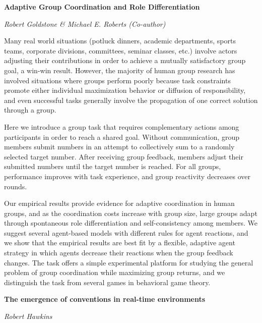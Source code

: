 \documentclass[10pt,letterpaper]{article}
\begin{document}
\begin{center}\textbf{Adaptive Group Coordination and Role Differentiation}\end{center}
\begin{center}\emph{Robert Goldstone \& Michael E. Roberts (Co-author)}\end{center}

Many real world situations (potluck dinners, academic departments, sports teams, corporate divisions, committees, seminar classes, etc.) involve actors adjusting their contributions in order to achieve a mutually satisfactory group goal, a win-win result.  However, the majority of human group research has involved situations where groups perform poorly because task constraints promote either individual maximization behavior or diffusion of responsibility, and even successful tasks generally involve the propagation of one correct solution through a group.  

Here we introduce a group task that requires complementary actions among participants in order to reach a shared goal.  Without communication, group members submit numbers in an attempt to collectively sum to a randomly selected target number.  After receiving group feedback, members adjust their submitted numbers until the target number is reached.  For all groups, performance improves with task experience, and group reactivity decreases over rounds.  

Our empirical results provide evidence for adaptive coordination in human groups, and as the coordination costs increase with group size, large groups adapt through spontaneous role differentiation and self-consistency among members.  We suggest several agent-based models with different rules for agent reactions, and we show that the empirical results are best fit by a flexible, adaptive agent strategy in which agents decrease their reactions when the group feedback changes.  The task offers a simple experimental platform for studying the general problem of group coordination while maximizing group returns, and we distinguish the task from several games in behavioral game theory.

\begin{center}\textbf{The emergence of conventions in real-time environments}\end{center}
\begin{center}\emph{Robert Hawkins}\end{center}
\end{document}
